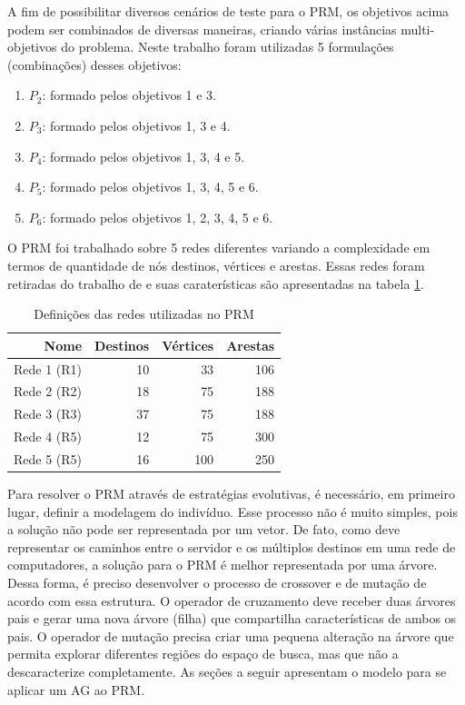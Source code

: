 A fim de possibilitar diversos cenários de teste para o PRM, os objetivos acima podem ser combinados de diversas maneiras, criando várias instâncias multi-objetivos do problema. Neste trabalho foram utilizadas 5 formulações (combinações) desses objetivos:

\begin{enumerate}
	\item $P_2$: formado pelos objetivos 1 e 3.
	\item $P_3$: formado pelos objetivos 1, 3 e 4.
	\item $P_4$: formado pelos objetivos 1, 3, 4 e 5.
	\item $P_5$: formado pelos objetivos 1, 3, 4, 5 e 6.
	\item $P_6$: formado pelos objetivos 1, 2, 3, 4, 5 e 6.
\end{enumerate}

O PRM foi trabalhado sobre 5 redes diferentes variando a complexidade em termos de quantidade de nós destinos, vértices e arestas. Essas redes foram retiradas do trabalho de \cite{Lafeta2016} e suas caraterísticas são apresentadas na tabela \ref{tab_prm_redes}.

\begin{table}[!htbp]
	\centering
	\caption{Definições das redes utilizadas no PRM}
	\label{tab_prm_redes}
	\begin{tabular}{r|rrr}
		Nome        & Destinos & Vértices & Arestas \\ \hline
		Rede 1 (R1) & 10       & 33       & 106     \\
		Rede 2 (R2) & 18       & 75       & 188     \\
		Rede 3 (R3) & 37       & 75       & 188     \\
		Rede 4 (R5) & 12       & 75       & 300     \\
		Rede 5 (R5) & 16       & 100      & 250     \\ \hline
	\end{tabular}
\end{table}

Para resolver o PRM através de estratégias evolutivas, é necessário, em primeiro lugar, definir a modelagem do indivíduo. Esse processo não é muito simples, pois a solução não pode ser representada por um vetor. De fato, como deve representar os caminhos entre o servidor e os múltiplos destinos em uma rede de computadores, a solução para o PRM é melhor representada por uma árvore. Dessa forma, é preciso desenvolver o processo de crossover e de mutação de acordo com essa estrutura. O operador de cruzamento deve receber duas árvores pais e gerar uma nova árvore (filha) que compartilha características de ambos os pais. O operador de mutação precisa criar uma pequena alteração na árvore que permita explorar diferentes regiões do espaço de busca, mas que não a descaracterize completamente. As seções a seguir apresentam o modelo para se aplicar um AG ao PRM.

